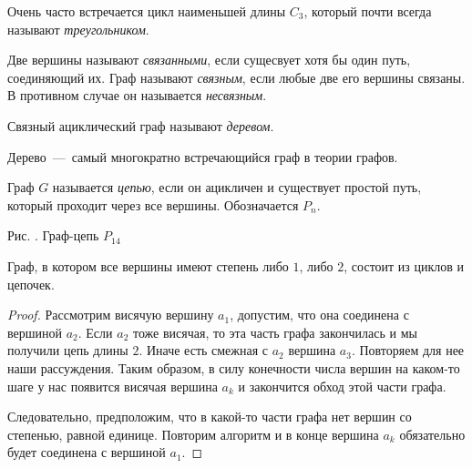 	Очень часто встречается цикл наименьшей длины $C_3$, который почти всегда называют \emph{треугольником}.

\begin{definition}
	Две вершины называют \emph{связанными}, если сущесвует хотя бы один путь, соединяющий их. Граф называют \emph{связным}, если любые две его вершины связаны. В противном случае он называется \emph{несвязным}.
\end{definition}

\begin{definition}
	Связный ациклический граф называют \emph{деревом}.
\end{definition}

	Дерево~---~самый многократно встречающийся граф в теории графов. 
	
\begin{definition}
	Граф $G$ называется \emph{цепью}, если он ацикличен и существует простой путь, который проходит через все вершины. Обозначается $P_n$.
\end{definition}

\begin{center}
\newline
\newline
	\small Рис. \images. Граф-цепь $P_{14}$
\end{center}

\begin{statement}
	Граф, в котором все вершины имеют степень либо $1$, либо $2$, состоит из циклов и цепочек.

\begin{proof}
	Рассмотрим висячую вершину $a_1$, допустим, что она соединена с вершиной $a_2$. Если $a_2$ тоже висячая, то эта часть графа закончилась и мы получили цепь длины $2$. Иначе есть смежная с $a_2$ вершина $a_3$. Повторяем для нее наши рассуждения. Таким образом, в силу конечности числа вершин на каком-то шаге у нас появится висячая вершина $a_k$ и закончится обход этой части графа.
	
	 Следовательно, предположим, что в какой-то части графа нет вершин со степенью, равной единице. Повторим алгоритм и в конце вершина $a_k$ обязательно будет соединена с вершиной $a_1$.
\end{proof}
\end{statement}

